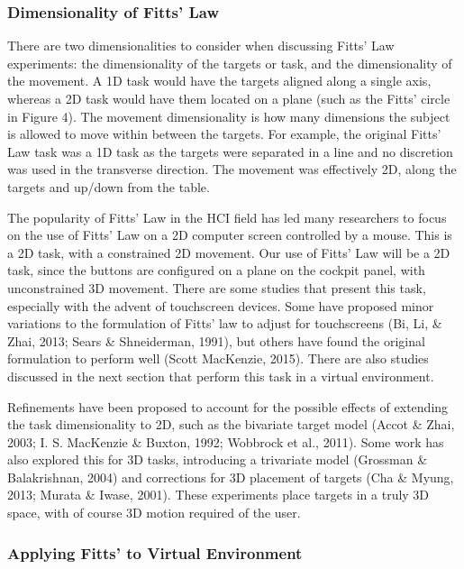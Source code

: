 \subsubsection{Dimensionality of Fitts' Law}\label{dimensionality-of-fitts-law}

There are two dimensionalities to consider when discussing Fitts' Law experiments: the dimensionality of the targets or task, and the dimensionality of the movement.
A 1D task would have the targets aligned along a single axis, whereas a 2D task would have them located on a plane (such as the Fitts' circle in Figure 4).
The movement dimensionality is how many dimensions the subject is allowed to move within between the targets.
For example, the original Fitts' Law task was a 1D task as the targets were separated in a line and no discretion was used in the transverse direction.
The movement was effectively 2D, along the targets and up/down from the table.

The popularity of Fitts' Law in the HCI field has led many researchers to focus on the use of Fitts' Law on a 2D computer screen controlled by a mouse.
This is a 2D task, with a constrained 2D movement.
Our use of Fitts' Law will be a 2D task, since the buttons are configured on a plane on the cockpit panel, with unconstrained 3D movement.
There are some studies that present this task, especially with the advent of touchscreen devices.
Some have proposed minor variations to the formulation of Fitts' law to adjust for touchscreens (Bi, Li, \& Zhai, 2013; Sears \& Shneiderman, 1991), but others have found the original formulation to perform well (Scott MacKenzie, 2015).
There are also studies discussed in the next section that perform this task in a virtual environment.

Refinements have been proposed to account for the possible effects of extending the task dimensionality to 2D, such as the bivariate target model (Accot \& Zhai, 2003; I.
S.
MacKenzie \& Buxton, 1992; Wobbrock et al., 2011).
Some work has also explored this for 3D tasks, introducing a trivariate model (Grossman \& Balakrishnan, 2004) and corrections for 3D placement of targets (Cha \& Myung, 2013; Murata \& Iwase, 2001).
These experiments place targets in a truly 3D space, with of course 3D motion required of the user.

\subsubsection{Applying Fitts' to Virtual Environment}\label{applying-fitts-to-virtual-environment}

